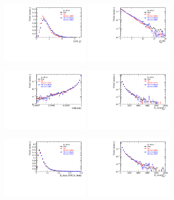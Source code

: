 \begin{figure}[h]
\centering
\includegraphics[height=!,width=0.4\textwidth]{figs/dataVsMC/norm_final/combined/Ds2KKpi_1_DTF_CHI2NDOF.pdf}
\includegraphics[height=!,width=0.4\textwidth]{figs/dataVsMC/norm_final/combined/Ds2KKpi_1_Bs_IPCHI2_OWNPV.pdf}

\includegraphics[height=!,width=0.4\textwidth]{figs/dataVsMC/norm_final/combined/Ds2KKpi_1_Bs_DIRA_OWNPV.pdf}
\includegraphics[height=!,width=0.4\textwidth]{figs/dataVsMC/norm_final/combined/Ds2KKpi_1_XsDaughters_min_IPCHI2.pdf}

\includegraphics[height=!,width=0.4\textwidth]{figs/dataVsMC/norm_final/combined/Ds2KKpi_1_Xs_max_DOCA.pdf}
\includegraphics[height=!,width=0.4\textwidth]{figs/dataVsMC/norm_final/combined/Ds2KKpi_1_DsDaughters_min_IPCHI2.pdf}


\end{figure}
